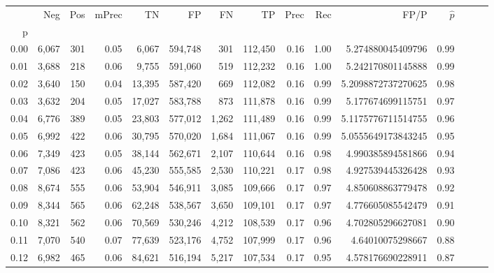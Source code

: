 \begin{tabular}{rrrrrrrrrrrrrrr}
\toprule
{} &     Neg &    Pos & mPrec &       TN &       FP &       FN &       TP &  Prec &   Rec &                  FP/P & $\hat{p}$ \\
p    &         &        &       &          &          &          &          &       &       &                       &           \\
\midrule
0.00 &   6,067 &    301 &  0.05 &    6,067 &  594,748 &      301 &  112,450 &  0.16 &  1.00 &     5.274880045409796 &      0.99 \\
0.01 &   3,688 &    218 &  0.06 &    9,755 &  591,060 &      519 &  112,232 &  0.16 &  1.00 &     5.242170801145888 &      0.99 \\
0.02 &   3,640 &    150 &  0.04 &   13,395 &  587,420 &      669 &  112,082 &  0.16 &  0.99 &    5.2098872737270625 &      0.98 \\
0.03 &   3,632 &    204 &  0.05 &   17,027 &  583,788 &      873 &  111,878 &  0.16 &  0.99 &     5.177674699115751 &      0.97 \\
0.04 &   6,776 &    389 &  0.05 &   23,803 &  577,012 &    1,262 &  111,489 &  0.16 &  0.99 &    5.1175776711514755 &      0.96 \\
0.05 &   6,992 &    422 &  0.06 &   30,795 &  570,020 &    1,684 &  111,067 &  0.16 &  0.99 &    5.0555649173843245 &      0.95 \\
0.06 &   7,349 &    423 &  0.05 &   38,144 &  562,671 &    2,107 &  110,644 &  0.16 &  0.98 &     4.990385894581866 &      0.94 \\
0.07 &   7,086 &    423 &  0.06 &   45,230 &  555,585 &    2,530 &  110,221 &  0.17 &  0.98 &     4.927539445326428 &      0.93 \\
0.08 &   8,674 &    555 &  0.06 &   53,904 &  546,911 &    3,085 &  109,666 &  0.17 &  0.97 &     4.850608863779478 &      0.92 \\
0.09 &   8,344 &    565 &  0.06 &   62,248 &  538,567 &    3,650 &  109,101 &  0.17 &  0.97 &     4.776605085542479 &      0.91 \\
0.10 &   8,321 &    562 &  0.06 &   70,569 &  530,246 &    4,212 &  108,539 &  0.17 &  0.96 &     4.702805296627081 &      0.90 \\
0.11 &   7,070 &    540 &  0.07 &   77,639 &  523,176 &    4,752 &  107,999 &  0.17 &  0.96 &      4.64010075298667 &      0.88 \\
0.12 &   6,982 &    465 &  0.06 &   84,621 &  516,194 &    5,217 &  107,534 &  0.17 &  0.95 &     4.578176690228911 &      0.87 \\

\end{tabular}
